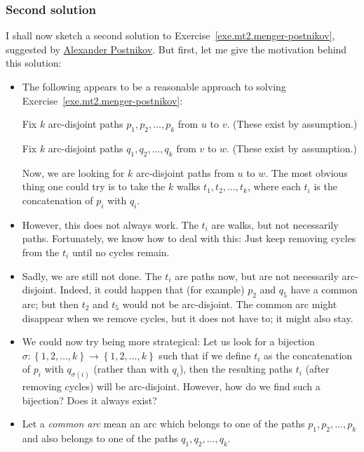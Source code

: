 \documentclass[numbers=enddot,12pt,final,onecolumn,notitlepage]{scrartcl}%
\theoremstyle{definition}
\newcommand{\set}[1]{\left\{ #1 \right\}}
\newcommand{\tup}[1]{\left( #1 \right)}
\begin{document}
\subsubsection{Second solution}

I shall now sketch a second solution to
Exercise~\ref{exe.mt2.menger-postnikov}, suggested by
\href{https://math.mit.edu/~apost/}{Alexander Postnikov}.
But first, let me give the motivation behind this solution:

\begin{itemize}
\item The following appears to be a reasonable approach to solving
      Exercise~\ref{exe.mt2.menger-postnikov}: \par
      Fix $k$ arc-disjoint paths $p_1, p_2, \ldots, p_k$ from $u$ to
      $v$. (These exist by assumption.) \par
      Fix $k$ arc-disjoint paths $q_1, q_2, \ldots, q_k$ from $v$ to
      $w$. (These exist by assumption.) \par
      Now, we are looking for $k$ arc-disjoint paths from $u$ to $w$.
      The most obvious thing one could try is to take the $k$ walks
      $t_1, t_2, \ldots, t_k$, where each $t_i$ is the concatenation
      of $p_i$ with $q_i$.
\item However, this does not always work.
      The $t_i$ are walks, but not necessarily paths.
      Fortunately, we know how to deal with this:
      Just keep removing cycles from the $t_i$ until no cycles remain.
\item Sadly, we are still not done.
      The $t_i$ are paths now, but are not necessarily arc-disjoint.
      Indeed, it could happen that (for example) $p_2$ and $q_5$ have
      a common arc; but then $t_2$ and $t_5$ would not be
      arc-disjoint.
      The common arc might disappear when we remove cycles,
      but it does not have to; it might also stay.
\item We could now try being more strategical:
      Let us look for a bijection
      $\sigma : \set{1, 2, \ldots, k} \to \set{1, 2, \ldots, k}$
      such that if we define $t_i$ as the concatenation of
      $p_i$ with $q_{\sigma \tup{i}}$ (rather than with $q_i$), then
      the resulting paths $t_i$ (after removing cycles) will be
      arc-disjoint.
      However, how do we find such a bijection? Does it always exist?
\item Let a \textit{common arc} mean an arc which belongs to one of
      the paths $p_1, p_2, \ldots, p_k$ and also belongs to one of the
      paths $q_1, q_2, \ldots, q_k$.

\end{itemize}
\end{document}
